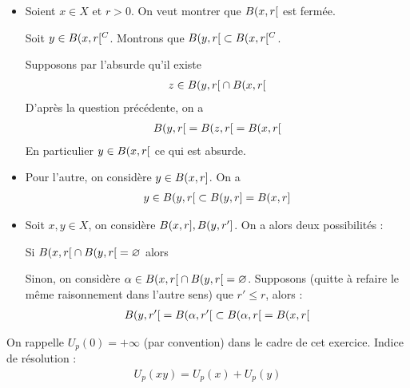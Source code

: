 \documentclass[french,a4paper,10pt]{article}
\begin{document}
\begin{td-sol}
\begin{itemize}
			Soit $x'\in B(x,\varepsilon)$, on a
			\[\begin{gathered}
				d(x',x)\le\varepsilon\\\text{et }d(x,y)\le\varepsilon\\\text{et }d(x',y)\le\max\{d(x',x),d(x,y)\}
			\end{gathered}\]
			Et donc $x'\in B(y,\varepsilon)$, soit que
				\[\begin{aligned}
					\bolo{x,\varepsilon}\sub \bolo{y,\varepsilon}
				\end{aligned}\]
			Pour l'autre sens on a
				\[\begin{aligned}
					y\in\bolo{x,\varepsilon}&\Longleftrightarrow d(x,y)<\varepsilon\\
					&\Longleftrightarrow x\in \bolo{y,\varepsilon}
				\end{aligned}\]
				
			\item Soient $x\in X$ et $r>0$. On veut montrer que $B({x,r}\mathopen{}[\mathclose{}$ est fermée.
			
			Soit $y\in B({x,r}\mathopen{}[\mathclose{}^C$. Montrons que $B({y,r}\mathopen{}[\mathclose{}\subset B({x,r}\mathopen{}[\mathclose{}^C$.
			
			Supposons par l'absurde qu'il existe
				\[\begin{aligned}
					z\in B({y,r}\mathopen{}[\mathclose{}\cap B({x,r}\mathopen{}[\mathclose{}
				\end{aligned}\]
			D'après la question précédente, on a
				\[\begin{aligned}
					B({y,r}\mathopen{}[\mathclose{}=B({z,r}\mathopen{}[\mathclose{}=B({x,r}\mathopen{}[\mathclose{}
				\end{aligned}\]
			En particulier $y\in B({x,r}\mathopen{}[\mathclose{}$ ce qui est absurde.
			
			\item Pour l'autre, on considère $y\in B({x,r}\mathopen{}]\mathclose{}$. On a
			\[\begin{aligned}
				y\in B({y,r}\mathopen{}[\mathclose{}\subset B({y,r}\mathopen{}]\mathclose{}=B({x,r}\mathopen{}]\mathclose{}
			\end{aligned}\]
			
			\item Soit $x,y\in X$, on considère $B({x,r}\mathopen{}]\mathclose{},B({y,r'}\mathopen{}]\mathclose{}$. On a alors deux possibilités :
			
			Si $B({x,r}\mathopen{}[\mathclose{}\cap B({y,r}\mathopen{}[\mathclose{}=\varnothing$ alors
			
			
			Sinon, on considère $\alpha \in B({x,r}\mathopen{}[\mathclose{}\cap B({y,r}\mathopen{}[\mathclose{}=\varnothing$. Supposons (quitte à refaire le même raisonnement dans l'autre sens) que $r'\le r$, alors :
				\[\begin{aligned}
					B({y,r'}\mathopen{}[\mathclose{}=B({\alpha,r'}\mathopen{}[\mathclose{}\subset B({\alpha,r}\mathopen{}[\mathclose{}=B({x,r}\mathopen{}[\mathclose{}
				\end{aligned}\]
		\end{itemize}
	\end{td-sol}
	\begin{td-exo}
		On rappelle $U_p(0)=+\infty$ (par convention) dans le cadre de cet exercice. Indice de résolution :
			\[\begin{aligned}
				U_p(xy)=U_p(x)+U_p(y)
			\end{aligned}\]
	\end{td-exo}
	
\end{document}
